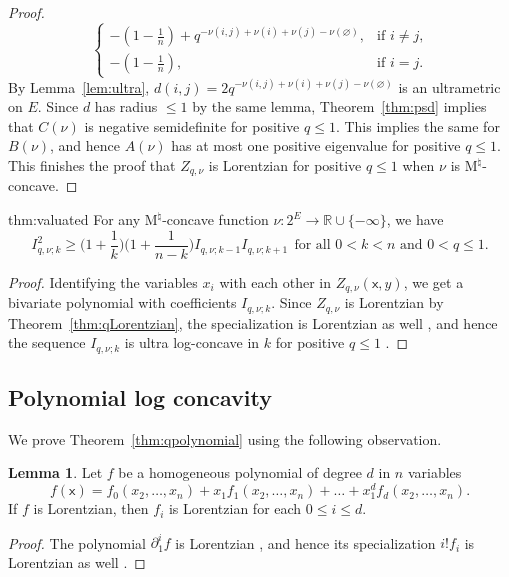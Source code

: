 \documentclass{amsart}
\theoremstyle{definition}
\newtheorem{lemma}[theorem]{Lemma}
\theoremstyle{remark}
\newcommand{\x}{\mathsf{x}}    %
\newcommand{\1}{\mathbf{1}}
\newcommand{\Mnat}{$\text{M}^\natural$}
\numberwithin{equation}{section}
\begin{document}
\begin{proof}
\[\begin{cases}
    - (1-\frac{1}{n})+q^{-\nu(i,j)+\nu(i)+\nu(j)-\nu(\varnothing)}, & \text{if $i\neq j$,}\\
    - (1-\frac{1}{n}), & \text{if $i=j$.}
  \end{cases}
  \]
  By Lemma~\ref{lem:ultra}, 
$d(i,j)=2q^{-\nu(i,j)+\nu(i)+\nu(j)-\nu(\varnothing)}$ is an ultrametric on $E$. Since $d$ has radius $\le 1$ by the same lemma, Theorem~\ref{thm:psd} implies that $C(\nu)$ is negative semidefinite for positive $q \le 1$.
This implies the same for $B(\nu)$, and hence
 $A(\nu)$ 
has at most one positive eigenvalue for positive $q\le 1$. This finishes the proof that $Z_{q,\nu}$ is Lorentzian for positive $q \le 1$ when $\nu$ is \Mnat-concave.
\end{proof}

\begin{reptheorem}{thm:valuated}
For any \Mnat-concave function $\nu\colon 2^{E} \to \mathbb{R} \cup \{-\infty\}$,  we have
\[
I_{q,\nu;k}^2 \geq \Big(1+\frac1k\Big)\Big(1+\frac1{n-k}\Big) I_{q,\nu;k-1}
    I_{q,\nu;k+1} \ \ \text{for  all $0<k<n$ and $0<q\leq 1$.}
\]
\end{reptheorem}


\begin{proof}
Identifying the variables $x_i$ with each other in $Z_{q,\nu}(\x,y)$, we get a bivariate polynomial with coefficients $I_{q,\nu;k}$.
Since $Z_{q,\nu}$ is Lorentzian by Theorem~\ref{thm:qLorentzian}, the specialization is Lorentzian as well \cite[Theorem 2.10]{BH20}, and hence the sequence $I_{q,\nu;k}$ is ultra log-concave in $k$ for positive $q \le 1$ \cite[Example 2.3]{BH20}.
\end{proof}

\subsection{Polynomial log concavity}\label{sec:polynomial}

We prove Theorem~\ref{thm:qpolynomial} using the following observation.

\begin{lemma}\label{lem:coeffLorentzian}
Let $f$ be a homogeneous polynomial of degree $d$ in $n$ variables \[
    f(\x) = f_0(x_2,\dots,x_n) + x_1 f_1(x_2,\dots,x_n) + \dots + x_1^d f_d(x_2,\dots,x_n).
    \]
If $f$ is Lorentzian, then $f_i$ is Lorentzian for each $0\leq i \leq d$.
\end{lemma}

\begin{proof}
The polynomial $ \partial_1^i f$ is Lorentzian \cite[Corollary 2.11]{BH20}, and hence its specialization $i! f_i$ is Lorentzian as well  \cite[Theorem 2.10]{BH20}.
\end{proof}
\end{document}
